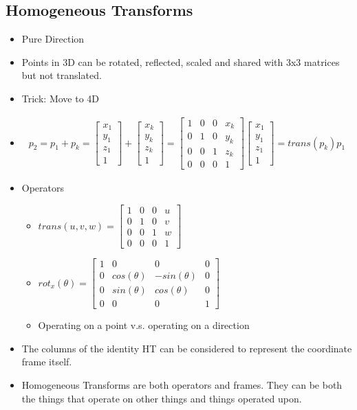 \documentclass[../main.tex]{subfiles}
\begin{document}
  \subsection{Homogeneous Transforms}
  \begin{itemize}
    \item Pure Direction
    \item Points in 3D can be rotated, reflected, scaled and shared with 3x3 matrices but not translated.
    \item Trick: Move to 4D
    \item
    \begin{align*}
        p_{2} = p_{1} + p_{k} = \begin{bmatrix} x_{1} \\ y_{1} \\ z_{1} \\ 1 \end{bmatrix} + \begin{bmatrix} x_{k} \\ y_{k} \\ z_{k} \\ 1 \end{bmatrix} = \begin{bmatrix} 1 & 0 & 0 & x_{k} \\ 0 & 1 & 0 & y_{k} \\ 0 & 0 & 1 & z_{k} \\ 0 & 0 & 0 & 1 \end{bmatrix} \begin{bmatrix} x_{1} \\ y_{1} \\ z_{1} \\ 1 \end{bmatrix} = trans(p_{k})p_{1}
    \end{align*}
    \item Operators
    \begin{itemize}
        \item
        $trans(u, v, w) = \begin{bmatrix} 1 & 0 & 0 & u \\ 0 & 1 & 0 & v \\ 0 & 0 & 1 & w \\ 0 & 0 & 0 & 1 \end{bmatrix}$
        \item
        $rot_{x}(\theta) = \begin{bmatrix} 1 & 0 & 0 & 0 \\ 0 & cos(\theta) & -sin(\theta) & 0 \\ 0 & sin(\theta) & cos(\theta) & 0 \\ 0 & 0 & 0 & 1 \end{bmatrix}$
        \item Operating on a point v.s. operating on a direction
    \end{itemize}
    \item The columns of the identity HT can be considered to represent the coordinate frame itself.
    \item Homogeneous Transforms are both operators and frames. They can be both the things that operate on other things and things operated upon.
  \end{itemize}
\end{document}
